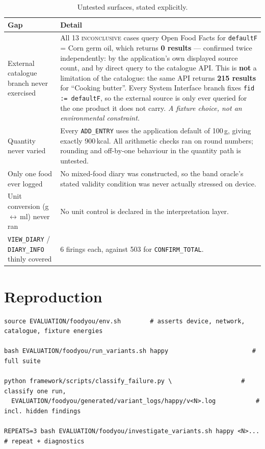 \documentclass[11pt,a4paper]{article}
\newcommand{\gate}[1]{\texttt{\small #1}}
\begin{document}
\begin{table}[h]
\centering\footnotesize
\caption{Untested surfaces, stated explicitly.}
\begin{tabular}{@{}p{4.2cm}p{11.2cm}@{}}
\toprule
\textbf{Gap} & \textbf{Detail} \\
\midrule
External catalogue branch never exercised &
All 13 \textsc{inconclusive} cases query Open Food Facts for
\texttt{defaultF} = Corn germ oil, which returns \textbf{0 results} --- confirmed
twice independently: by the application's own displayed source count, and by direct
query to the catalogue API. This is \textbf{not} a limitation of the catalogue: the
same API returns \textbf{215 results} for ``Cooking butter''. Every System Interface
branch fixes \texttt{fid := defaultF}, so the external source is only ever queried
for the one product it does not carry. \emph{A fixture choice, not an environmental
constraint.} \\
\addlinespace
Quantity never varied &
Every \gate{ADD\_ENTRY} uses the application default of 100\,g, giving exactly
900\,kcal. All arithmetic checks ran on round numbers; rounding and off-by-one
behaviour in the quantity path is untested. \\
\addlinespace
Only one food ever logged &
No mixed-food diary was constructed, so the band oracle's stated validity condition
was never actually stressed on device. \\
\addlinespace
Unit conversion (g\,$\leftrightarrow$\,ml) never ran &
No unit control is declared in the interpretation layer. \\
\addlinespace
\gate{VIEW\_DIARY} / \gate{DIARY\_INFO} thinly covered &
6 firings each, against 503 for \gate{CONFIRM\_TOTAL}. \\
\bottomrule
\end{tabular}
\end{table}

\section{Reproduction}
\label{sec:repro}

\begin{lstlisting}
source EVALUATION/foodyou/env.sh        # asserts device, network, catalogue, fixture energies

bash EVALUATION/foodyou/run_variants.sh happy                       # full suite

python framework/scripts/classify_failure.py \                   # classify one run,
  EVALUATION/foodyou/generated/variant_logs/happy/v<N>.log           # incl. hidden findings

REPEATS=3 bash EVALUATION/foodyou/investigate_variants.sh happy <N>...  # repeat + diagnostics
\end{lstlisting}
\end{document}
